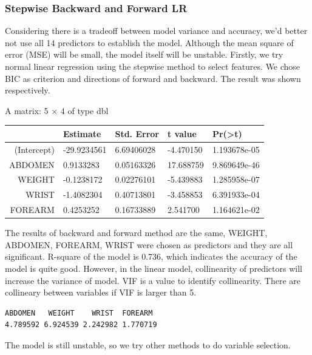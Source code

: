 \documentclass[11pt]{article}
\begin{document}
\hypertarget{stepwise-backward-and-forward-lr}{%
\subsubsection{Stepwise Backward and Forward
LR}\label{stepwise-backward-and-forward-lr}}

Considering there is a tradeoff between model variance and accuracy,
we'd better not use all 14 predictors to establish the model. Although
the mean square of error (MSE) will be small, the model itself will be
unstable. Firstly, we try normal linear regression using the stepwise
method to select features. We chose BIC as criterion and directions of
forward and backward. The result was shown respectively.

    A matrix: 5 × 4 of type dbl
\begin{tabular}{r|llll}
  & Estimate & Std. Error & t value & Pr(>\textbar{}t\textbar{})\\
\hline
	(Intercept) & -29.9234561 & 6.69406028 & -4.470150 & 1.193678e-05\\
	ABDOMEN &   0.9133283 & 0.05163326 & 17.688759 & 9.869649e-46\\
	WEIGHT &  -0.1238172 & 0.02276101 & -5.439883 & 1.285958e-07\\
	WRIST &  -1.4082304 & 0.40713801 & -3.458853 & 6.391933e-04\\
	FOREARM &   0.4253252 & 0.16733889 &  2.541700 & 1.164621e-02\\
\end{tabular}


    
    The results of backward and forward method are the same, WEIGHT,
ABDOMEN, FOREARM, WRIST were chosen as predictors and they are all
significant. R-square of the model is 0.736, which indicates the
accuracy of the model is quite good. However, in the linear model,
collinearity of predictors will increase the variance of model. VIF is a
value to identify collinearity. There are collineary between variables
if VIF is larger than 5.

    \begin{Verbatim}[commandchars=\\\{\}]
 ABDOMEN   WEIGHT    WRIST  FOREARM 
4.789592 6.924539 2.242982 1.770719 

    \end{Verbatim}

    The model is still unstable, so we try other methods to do variable
selection.
\end{document}
